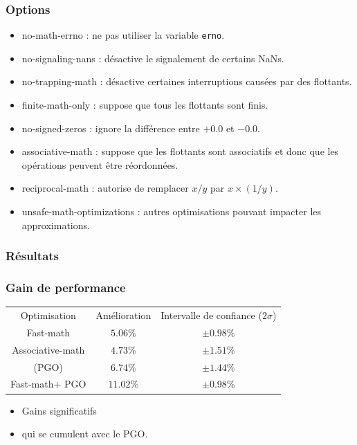 \documentclass{beamer}
\begin{document}
\begin{frame}[fragile]
    \frametitle{Options}

    \begin{itemize}
        \item no-math-errno : ne pas utiliser la variable \verb'erno'.
        \item no-signaling-nans : désactive le signalement de certains NaNs.
        \item no-trapping-math : désactive certaines interruptions causées par des flottants.
        \item finite-math-only : suppose que tous les flottants sont finis.
        \item no-signed-zeros : ignore la différence entre $+0.0$ et $-0.0$.
        \item associative-math : suppose que les flottants sont associatifs et donc que les opérations peuvent être réordonnées.
        \item reciprocal-math : autorise de remplacer $x/y$ par $x \times (1/y)$.
        \item unsafe-math-optimizations : autres optimisations pouvant impacter les approximations.
    \end{itemize}
\end{frame}

\subsubsection{Résultats}

\begin{frame}[fragile]
    \frametitle{Gain de performance}

    \begin{center}
        \begin{tabular}{ c c c }
            Optimisation                    & Amélioration & Intervalle de confiance ($2\sigma$) \\
            Fast-math\footnotemark[1]       & $5.06\%$     & $\pm 0.98\%$                        \\
            Associative-math                & $4.73\%$     & $\pm 1.51\%$                        \\
            (PGO)                           & $6.74\%$     & $\pm 1.44\%$                        \\
            Fast-math\footnotemark[1] + PGO & $11.02\%$    & $\pm 0.98\%$
        \end{tabular}
    \end{center}

    \begin{itemize}
        \item Gains significatifs
        \item qui se cumulent avec le PGO.
    \end{itemize}

\end{frame}
\end{document}
